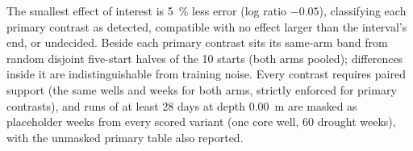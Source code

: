 The smallest effect of interest is \SI{5}{\percent} less error (log ratio $-0.05$), classifying
each primary contrast as detected, compatible with no effect larger than the interval's end, or
undecided. Beside each primary contrast sits its same-arm band from random disjoint five-start
halves of the 10 starts (both arms pooled); differences inside it are indistinguishable from
training noise. Every contrast requires paired support (the same wells and weeks for both arms,
strictly enforced for primary contrasts), and runs of at least 28 days at depth \SI{0.00}{m} are
masked as placeholder weeks from every scored variant (one core well, 60 drought weeks), with the
unmasked primary table also reported.

